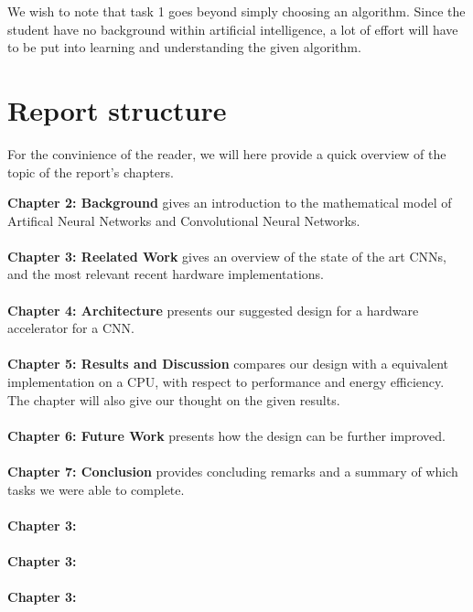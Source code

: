 We wish to note that task 1 goes beyond simply choosing an algorithm. Since the student have no background within artificial intelligence, a lot of effort will have to be put into learning and understanding the given algorithm. 


\section{Report structure}

For the convinience of the reader, we will here provide a quick overview of the topic of the report's chapters. 

\textbf{Chapter 2: Background} gives an introduction to the mathematical model of Artifical Neural Networks and Convolutional Neural Networks. \\ \hfil \\ \hfil
\textbf{Chapter 3: Reelated Work} gives an overview of the state of the art CNNs, and the most relevant recent hardware implementations. \\ \hfil \\ \hfil
\textbf{Chapter 4: Architecture} presents our suggested design for a hardware accelerator for a CNN.  \\ \hfil \\ \hfil
\textbf{Chapter 5: Results and Discussion} compares our design with a equivalent implementation on a CPU, with respect to performance and energy efficiency. The chapter will also give our thought on the given results.  \\ \hfil \\ \hfil
\textbf{Chapter 6: Future Work} presents how the design can be further improved. \\ \hfil \\ \hfil
\textbf{Chapter 7: Conclusion} provides concluding remarks and a summary of which tasks we were able to complete.\\ \hfil \\ \hfil
\textbf{Chapter 3:} \\ \hfil \\ \hfil
\textbf{Chapter 3:} \\ \hfil \\ \hfil
\textbf{Chapter 3:} \\ \hfil \\ \hfil


